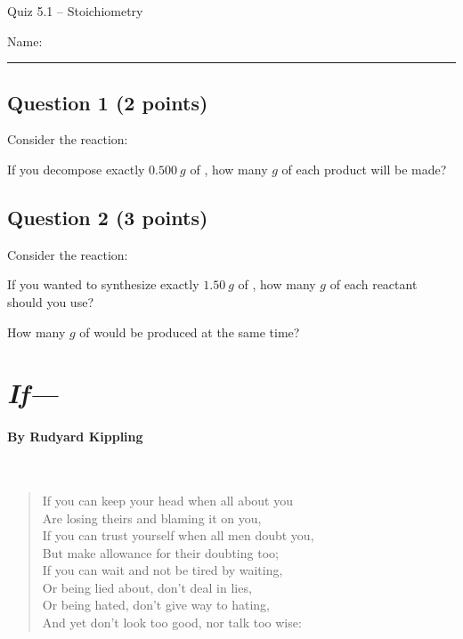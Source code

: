 \documentclass[11pt, letterpaper]{memoir}
\begin{document}
	\begin{center}
		{\large	Quiz 5.1 -- Stoichiometry}
	\end{center}
{\large Name: \rule[-1mm]{4in}{.1pt}
	
	\subsection*{Question 1 (2 points)}
	Consider the reaction: 
	
	\noindent
	If you decompose exactly $0.500~g$ of , how many $g$ of each product will be made?
	
	\vspace{15em}
	\subsection*{Question 2 (3 points)}
	Consider the reaction: 
	
	\noindent
	If you wanted to synthesize exactly $1.50~g$ of , how many $g$ of each reactant should you use?
	
	\vspace{15em}
	\noindent 
	How many $g$ of  would be produced at the same time?
\newpage
\pagestyle{empty}
\addtocounter{page}{-1}
\section*{\emph{If---}}
\paragraph{By Rudyard Kippling}~
\begin{verse}
	If you can keep your head when all about you\\
	\hspace{0.5em} Are losing theirs and blaming it on you,\\
	If you can trust yourself when all men doubt you,\\
	\hspace{0.5em} But make allowance for their doubting too;\\
	If you can wait and not be tired by waiting,\\
	\hspace{0.5em} Or being lied about, don’t deal in lies,\\
	Or being hated, don’t give way to hating,\\
	\hspace{0.5em} And yet don’t look too good, nor talk too wise:


\end{verse}}
\end{document}

